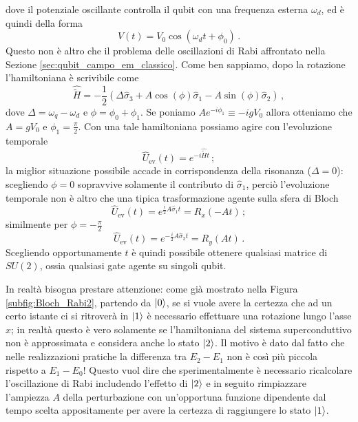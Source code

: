 dove il potenziale oscillante controlla il qubit con una frequenza esterna $\omega_d$, ed è quindi della forma
\begin{equation*}
    V(t) = V_0 \cos \! \left( \omega_d t + \phi_0 \right) \, .
\end{equation*}
Questo non è altro che il problema delle oscillazioni di Rabi affrontato nella Sezione \ref{sec:qubit_campo_em_classico}. Come ben sappiamo, dopo la rotazione l'hamiltoniana è scrivibile come
\begin{equation*}
    \hat{\tilde{H}} = -\frac{1}{2} \left( \Delta \hat{\sigma}_3 + A \cos(\phi) \hat{\sigma}_1 - A \sin (\phi) \hat{\sigma}_2 \right) \, ,
\end{equation*}
dove $\Delta = \omega_q - \omega_d$ e $\phi = \phi_0 + \phi_1$. Se poniamo $A e^{-i \phi_1} \equiv - i g V_0$ allora otteniamo che $A = g V_0$ e $\phi_1 = \frac{\pi}{2}$. Con una tale hamiltoniana possiamo agire con l'evoluzione temporale
\begin{equation*}
    \hat{U}_{\text{ev}}(t) = e^{-i \hat{\tilde{H}} t} \, ;
\end{equation*}
la miglior situazione possibile accade in corrispondenza della risonanza ($\Delta = 0$): scegliendo $\phi = 0$ sopravvive solamente il contributo di $\hat{\sigma}_1$, perciò l'evoluzione temporale non è altro che una tipica trasformazione agente sulla sfera di Bloch
\begin{equation*}
    \hat{U}_{\text{ev}}(t) = e^{\frac{i}{2} A \hat{\sigma}_1 t} = R_x(-At) \, ;
\end{equation*}
similmente per $\phi = -\frac{\pi}{2}$
\begin{equation*}
    \hat{U}_{\text{ev}}(t) = e^{-\frac{i}{2} A \hat{\sigma}_2 t} = R_y(At) \, .
\end{equation*}
Scegliendo opportunamente $t$ è quindi possibile ottenere qualsiasi matrice di $SU(2)$, ossia qualsiasi gate agente su singoli qubit. 

\noindent In realtà bisogna prestare attenzione: come già mostrato nella Figura \ref{subfig:Bloch_Rabi2}, partendo da $\ket{0}$, se si vuole avere la certezza che ad un certo istante ci si ritroverà in $\ket{1}$ è necessario effettuare una rotazione lungo l'asse $x$; in realtà questo è vero solamente se l'hamiltoniana del sistema superconduttivo non è approssimata e considera anche lo stato $\ket{2}$. Il motivo è dato dal fatto che nelle realizzazioni pratiche la differenza tra $E_2 - E_1$ non è così più piccola rispetto a $E_1-E_0$! Questo vuol dire che sperimentalmente è necessario ricalcolare l'oscillazione di Rabi includendo l'effetto di $\ket{2}$ e in seguito rimpiazzare l'ampiezza $A$ della perturbazione con un'opportuna funzione dipendente dal tempo scelta appositamente per avere la certezza di raggiungere lo stato $\ket{1}$. 


